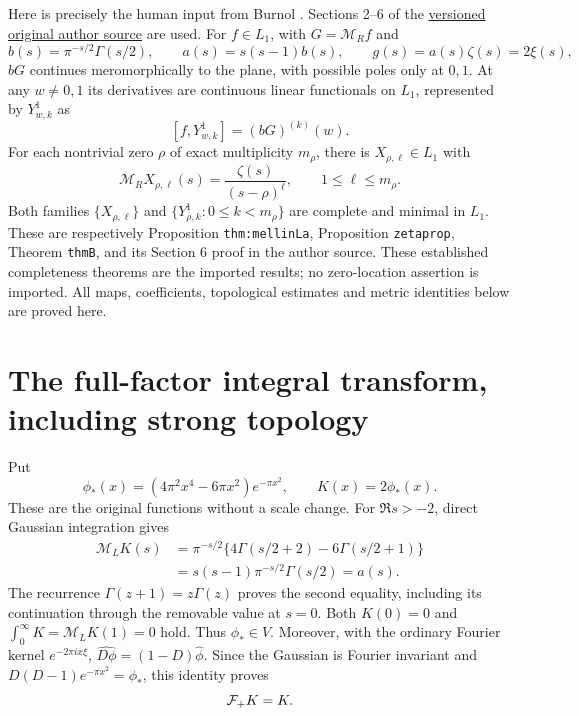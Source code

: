 \documentclass[11pt]{article}
\newcommand{\ML}{\mathcal M_{\!L}}\newcommand{\MR}{\mathcal M_{\!R}}
\begin{document}
Here is precisely the human input from Burnol \cite{Burnol}.
Sections 2--6 of the
\href{https://arxiv.org/abs/math/0203120v7}{versioned original author source}
are used.
For $f\in L_1$, with $G=\MR f$ and
\begin{equation}\label{eq:abg}
 b(s)=\pi^{-s/2}\Gamma(s/2),\qquad
 a(s)=s(s-1)b(s),\qquad g(s)=a(s)\zeta(s)=2\xi(s),
\end{equation}
$bG$ continues meromorphically to the plane, with possible poles
only at $0,1$. At any $w\ne0,1$ its derivatives are continuous
linear functionals on $L_1$, represented by $Y^1_{w,k}$ as
\begin{equation}\label{eq:burnol-eval}
 [f,Y^1_{w,k}]=(bG)^{(k)}(w).
\end{equation}
For each nontrivial zero $\rho$ of exact multiplicity $m_\rho$,
there is $X_{\rho,\ell}\in L_1$ with
\begin{equation}\label{eq:X}
 \MR X_{\rho,\ell}(s)=\frac{\zeta(s)}{(s-\rho)^\ell},
                 \qquad 1\leq\ell\leq m_\rho.
\end{equation}
Both families $\{X_{\rho,\ell}\}$ and
$\{Y^1_{\rho,k}:0\leq k<m_\rho\}$ are complete and minimal in
$L_1$. These are respectively Proposition \texttt{thm:mellinLa},
Proposition \texttt{zetaprop}, Theorem \texttt{thmB}, and its
Section 6 proof in the author source. These established completeness
theorems are the imported results; no zero-location assertion is
imported. All maps, coefficients, topological estimates and metric
identities below are proved here.

\section{The full-factor integral transform, including strong topology}

Put
\begin{equation}\label{eq:kernel}
 \phi_*(x)=(4\pi^2x^4-6\pi x^2)e^{-\pi x^2},\qquad K(x)=2\phi_*(x).
\end{equation}
These are the original functions without a scale change. For
$\Re s>-2$, direct Gaussian integration gives
\begin{align}
 \ML K(s)
 &=\pi^{-s/2}\{4\Gamma(s/2+2)-6\Gamma(s/2+1)\}\nonumber\\
 &=s(s-1)\pi^{-s/2}\Gamma(s/2)=a(s).\label{eq:MK}
\end{align}
The recurrence $\Gamma(z+1)=z\Gamma(z)$ proves the second equality,
including its continuation through the removable value at $s=0$.
Both $K(0)=0$ and $\int_0^\infty K=\ML K(1)=0$ hold. Thus
$\phi_*\in V$. Moreover, with the ordinary Fourier kernel
$e^{-2\pi i x\xi}$, $\widehat{D\phi}=(1-D)\widehat\phi$.
Since the Gaussian is Fourier invariant and
$D(D-1)e^{-\pi x^2}=\phi_*$, this identity proves
\begin{equation}\label{eq:selfdual}
 \mathcal F_+ K=K.
\end{equation}
\end{document}
